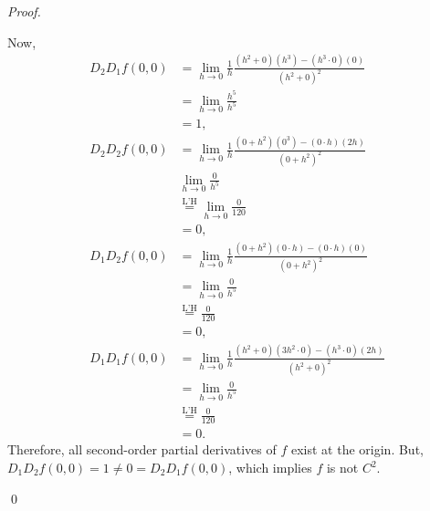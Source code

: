 \documentclass[12pt]{article}
\newenvironment{sol}
    {\emph{Proof.}
    }
    {
    \qed
    }
\begin{document}
\begin{sol}
   Now, \begin{align*}
       D_2D_1f(0,0) &= \lim_{h \to 0} \frac{1}{h}\frac{(h^2 + 0)(h^3) - (h^3 \cdot 0)(0)}{(h^2 + 0)^2} \\ &= \lim_{h \to 0} \frac{h^5}{h^5} \\ &= 1, \\ 
       D_2D_2f(0,0) &= \lim_{h \to 0} \frac{1}{h}\frac{(0 + h^2)(0^3) - (0 \cdot h)(2h)}{(0 + h^2)^2} \\ &\lim_{h \to 0} \frac{0}{h^5} \\ &\stackrel{\text{L'H}}{=} \lim_{h \to 0}
       \frac{0}{120} \\ &= 0, \\
       D_1D_2f(0,0) &= \lim_{h \to 0} \frac{1}{h}\frac{(0 + h^2)(0 \cdot h) - (0 \cdot h)(0)}{(0 + h^2)^2} \\ &= \lim_{h \to 0} \frac{0}{h^5} \\ &\stackrel{\text{L'H}}{=} \frac{0}{120} \\ &= 0, \\
       D_1D_1f(0,0) &= \lim_{h \to 0} \frac{1}{h}\frac{(h^2 + 0)(3h^2 \cdot 0) - (h^3 \cdot 0)(2h)}{(h^2 + 0)^2} \\ &= \lim_{h \to 0} \frac{0}{h^5} \\ &\stackrel{\text{L'H}}{=} \frac{0}{120} \\ &= 0.
   \end{align*}
   Therefore, all second-order partial derivatives of $f$ exist at the origin. But, $D_1D_2f(0,0) = 1 \neq 0 = D_2D_1f(0,0)$, which implies $f$ is not $C^2$. 
   
\end{sol}
\end{document}
